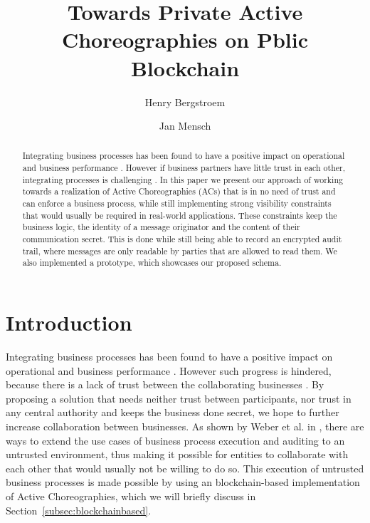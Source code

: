 \documentclass[runningheads]{llncs}
\newcommand{\refsec}[1]{Section~\ref{#1}}
\begin{document}
%
\title{Towards Private Active Choreographies on Pblic Blockchain }
%
%
\author{Henry Bergstroem \and
Jan Mensch}
%
%


%
\maketitle              %
%
\begin{abstract}
    Integrating business processes has been found to have a positive impact on operational and business performance \cite{flynn2010impact,narayanan2011antecedents}. However if business partners have little trust in each other, integrating processes is challenging \cite{panayides2009impact}. In this paper we present our approach of working towards a realization of Active Choreographies (ACs) that is in no need of trust and can enforce a business process, while still implementing strong visibility constraints that would usually be required in real-world applications. These constraints keep the business logic, the identity of a message originator and the content of their communication secret. This is done while still being able to record an encrypted audit trail, where messages are only readable by parties that are allowed to read them. We also implemented a  prototype, which showcases our proposed schema.
\end{abstract}

\section{Introduction} \label{sec:intro}

Integrating business processes has been found to have a positive impact on operational and business performance \cite{flynn2010impact,narayanan2011antecedents}. However such progress is hindered, because there is a lack of trust between the collaborating businesses \cite{panayides2009impact}. By proposing a solution that needs neither trust between participants, nor trust in any central authority and keeps the business done secret, we hope to further increase collaboration between businesses. As shown by Weber et al. in \cite{weber2016untrusted}, there are ways to extend the use cases of business process execution and auditing to an untrusted environment, thus making it possible for entities to collaborate with each other that would usually not be willing to do so. This execution of untrusted business processes is made possible by using an blockchain-based implementation of Active Choreographies, which we will briefly discuss in \refsec{subsec:blockchainbased}.
\end{document}
